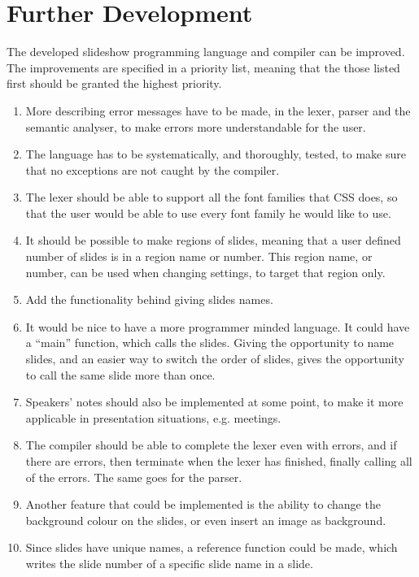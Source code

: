 \chapter{Further Development}
\label{sec:furtherdev}
The developed slideshow programming language and compiler can be improved. The improvements are specified in a priority list, meaning that the those listed first should be granted the highest priority.

\begin{enumerate}
	\item More describing error messages have to be made, in the lexer, parser and the semantic analyser, to make errors more understandable for the user.
	\item The language has to be systematically, and thoroughly, tested, to make sure that no exceptions are not caught by the compiler.
	\item The lexer should be able to support all the font families that CSS does, so that the user would be able to use every font family he would like to use.
	\item It should be possible to make regions of slides, meaning that a user defined number of slides is in a region name or number. This region name, or number, can be used when changing settings, to target that region only.
	\item Add the functionality behind giving slides names.
	\item It would be nice to have a more programmer minded language. It could have a ``main'' function, which calls the slides. Giving the opportunity to name slides, and an easier way to switch the order of slides, gives the opportunity to call the same slide more than once.
	\item Speakers' notes should also be implemented at some point, to make it more applicable in presentation situations, e.g. meetings.
	\item The compiler should be able to complete the lexer even with errors, and if there are errors, then terminate when the lexer has finished, finally calling all of the errors. The same goes for the parser.
	\item Another feature that could be implemented is the ability to change the background colour on the slides, or even insert an image as background.
	\item Since slides have unique names, a reference function could be made, which writes the slide number of a specific slide name in a slide.
\end{enumerate}